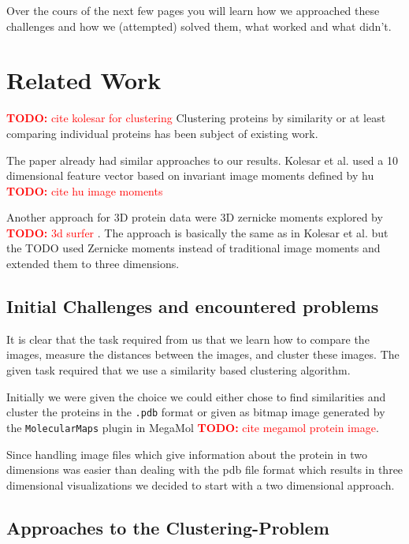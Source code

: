 \documentclass[journal]{vgtc}       %
\newcommand{\todo}[1]{\textcolor{red}{\textbf{TODO:} #1}}
\begin{document}
Over the cours of the next few pages you will learn how we approached these challenges and how we (attempted) solved them, what worked and what didn't.

\section{Related Work}\label{sec:relatedWork}

\todo{cite kolesar for clustering}
Clustering proteins by similarity or at least comparing individual proteins has been subject of existing work.

The paper \cite{kolesar} already had similar approaches to our results. Kolesar et al. used a 10 dimensional feature vector based on invariant image moments defined by hu \todo{cite hu image moments} \cite{humoments}

Another approach for 3D protein data were 3D zernicke moments explored by \todo{3d surfer } \cite{3dsurfer}. The approach is basically the same as in Kolesar et al. but the TODO used Zernicke moments instead of traditional image moments and extended them to three dimensions.



\subsection{Initial Challenges and encountered problems}

It is clear that the task required from us that we learn how to compare the images, measure the distances between the images, and cluster these images.
The given task required that we use a similarity based clustering algorithm.

Initially we were given the choice we could either chose to find similarities and cluster the proteins in the \verb|.pdb| format or given as bitmap image generated by the \verb|MolecularMaps| plugin in MegaMol \todo{cite megamol protein image}\cite{molecularmaps}.

Since handling image files which give information about the protein in two dimensions was easier than dealing with the pdb file format which results in three dimensional visualizations we decided to start with a two dimensional approach.





\subsection{Approaches to the Clustering-Problem}
\end{document}
